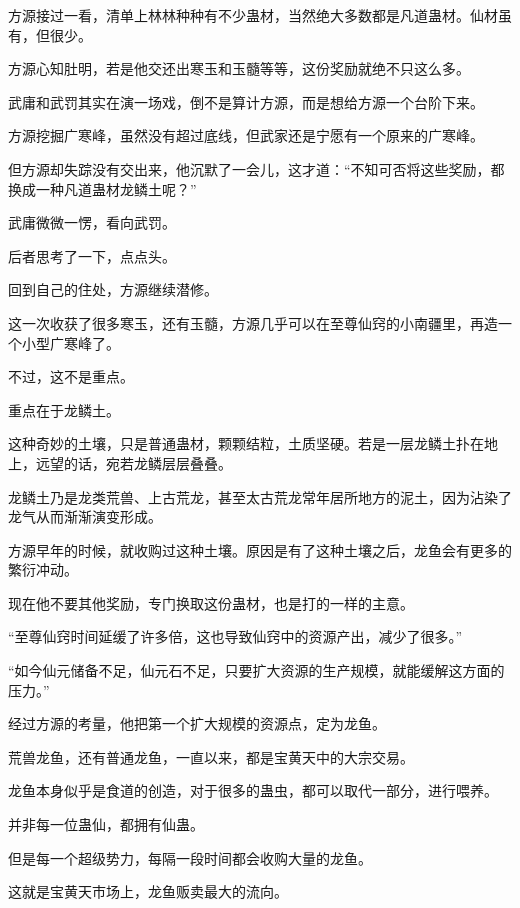 
\begin{this_body}



方源接过一看，清单上林林种种有不少蛊材，当然绝大多数都是凡道蛊材。仙材虽有，但很少。

方源心知肚明，若是他交还出寒玉和玉髓等等，这份奖励就绝不只这么多。

武庸和武罚其实在演一场戏，倒不是算计方源，而是想给方源一个台阶下来。

方源挖掘广寒峰，虽然没有超过底线，但武家还是宁愿有一个原来的广寒峰。

但方源却失踪没有交出来，他沉默了一会儿，这才道：“不知可否将这些奖励，都换成一种凡道蛊材龙鳞土呢？”

武庸微微一愣，看向武罚。

后者思考了一下，点点头。

回到自己的住处，方源继续潜修。

这一次收获了很多寒玉，还有玉髓，方源几乎可以在至尊仙窍的小南疆里，再造一个小型广寒峰了。

不过，这不是重点。

重点在于龙鳞土。

这种奇妙的土壤，只是普通蛊材，颗颗结粒，土质坚硬。若是一层龙鳞土扑在地上，远望的话，宛若龙鳞层层叠叠。

龙鳞土乃是龙类荒兽、上古荒龙，甚至太古荒龙常年居所地方的泥土，因为沾染了龙气从而渐渐演变形成。

方源早年的时候，就收购过这种土壤。原因是有了这种土壤之后，龙鱼会有更多的繁衍冲动。

现在他不要其他奖励，专门换取这份蛊材，也是打的一样的主意。

“至尊仙窍时间延缓了许多倍，这也导致仙窍中的资源产出，减少了很多。”

“如今仙元储备不足，仙元石不足，只要扩大资源的生产规模，就能缓解这方面的压力。”

经过方源的考量，他把第一个扩大规模的资源点，定为龙鱼。

荒兽龙鱼，还有普通龙鱼，一直以来，都是宝黄天中的大宗交易。

龙鱼本身似乎是食道的创造，对于很多的蛊虫，都可以取代一部分，进行喂养。

并非每一位蛊仙，都拥有仙蛊。

但是每一个超级势力，每隔一段时间都会收购大量的龙鱼。

这就是宝黄天市场上，龙鱼贩卖最大的流向。


\end{this_body}
